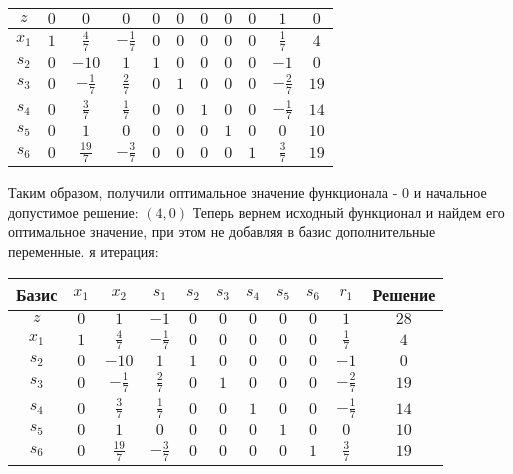 \documentclass{article}%
\begin{document}
\begin{flushleft}
\begin{tabular}{|c|ccccccccc|c|}
\hline%
$z$&$0$&$0$&$0$&$0$&$0$&$0$&$0$&$0$&$1$&$0$\\%
\hline%
$x_{1}$&$1$&$\frac{4}{7}$&$-\frac{1}{7}$&$0$&$0$&$0$&$0$&$0$&$\frac{1}{7}$&$4$\\%
$s_{2}$&$0$&$-10$&$1$&$1$&$0$&$0$&$0$&$0$&$-1$&$0$\\%
$s_{3}$&$0$&$-\frac{1}{7}$&$\frac{2}{7}$&$0$&$1$&$0$&$0$&$0$&$-\frac{2}{7}$&$19$\\%
$s_{4}$&$0$&$\frac{3}{7}$&$\frac{1}{7}$&$0$&$0$&$1$&$0$&$0$&$-\frac{1}{7}$&$14$\\%
$s_{5}$&$0$&$1$&$0$&$0$&$0$&$0$&$1$&$0$&$0$&$10$\\%
$s_{6}$&$0$&$\frac{19}{7}$&$-\frac{3}{7}$&$0$&$0$&$0$&$0$&$1$&$\frac{3}{7}$&$19$\\%
\hline%
\end{tabular}%
\newline%
\newline%
Таким образом, получили оптимальное значение функционала {-} 0 и начальное допустимое решение: %
$(4, 0)$%
\newline%
Теперь вернем исходный функционал и найдем его оптимальное значение, при этом не добавляя в базис дополнительные переменные.%
я итерация: %
\newline%
\newline%
\renewcommand{\arraystretch}{1.3}%
\begin{tabular}{|c|ccccccccc|c|}%
\hline%
Базис&$x_{1}$&$x_{2}$&$s_{1}$&$s_{2}$&$s_{3}$&$s_{4}$&$s_{5}$&$s_{6}$&$r_{1}$&Решение\\%
\hline%
$z$&$0$&$1$&$-1$&$0$&$0$&$0$&$0$&$0$&$1$&$28$\\%
\hline%
$x_{1}$&$1$&$\frac{4}{7}$&$-\frac{1}{7}$&$0$&$0$&$0$&$0$&$0$&$\frac{1}{7}$&$4$\\%
$s_{2}$&$0$&$-10$&$1$&$1$&$0$&$0$&$0$&$0$&$-1$&$0$\\%
$s_{3}$&$0$&$-\frac{1}{7}$&$\frac{2}{7}$&$0$&$1$&$0$&$0$&$0$&$-\frac{2}{7}$&$19$\\%
$s_{4}$&$0$&$\frac{3}{7}$&$\frac{1}{7}$&$0$&$0$&$1$&$0$&$0$&$-\frac{1}{7}$&$14$\\%
$s_{5}$&$0$&$1$&$0$&$0$&$0$&$0$&$1$&$0$&$0$&$10$\\%
$s_{6}$&$0$&$\frac{19}{7}$&$-\frac{3}{7}$&$0$&$0$&$0$&$0$&$1$&$\frac{3}{7}$&$19$\\%
\hline%
\end{tabular}%
\newline%
\newline%
\newline%

\end{flushleft}
\end{document}

